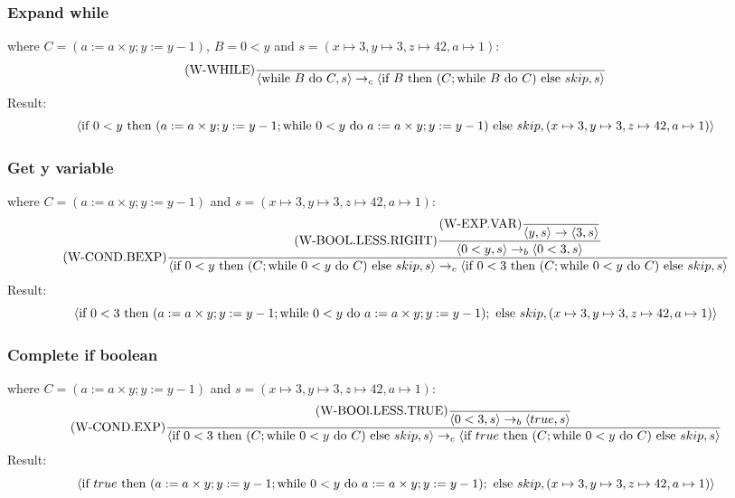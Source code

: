 \documentclass{report}
\begin{document}
            \subsubsection*{Expand while}
                where $C = (a:= a \times y; y:= y - 1)$, $B = 0<y$ and $s = (x \mapsto 3, y \mapsto 3, z \mapsto 42, a \mapsto 1)$:
                \[\text{(W-WHILE)}\dfrac{}{\langle \text{while } B \text{ do } C, s \rangle \to_c \langle \text{if } B \text{ then } (C; \text{while } B \text{ do } C) \text{ else } skip, s \rangle}\]
                Result:
                \[\langle \text{if } 0<y \text{ then } (a:= a \times y; y:= y - 1; \text{while } 0<y \text{ do } a:= a \times y; y:= y - 1) \text{ else } skip, (x \mapsto 3, y \mapsto 3, z \mapsto 42, a \mapsto 1) \rangle\]
            \subsubsection*{Get y variable}
                where $C = (a:= a \times y; y:= y - 1)$ and $s = (x \mapsto 3, y \mapsto 3, z \mapsto 42, a \mapsto 1)$:
                \[\text{(W-COND.BEXP)}\dfrac{
                    \text{(W-BOOL.LESS.RIGHT)}\dfrac{
                        \text{(W-EXP.VAR)}\dfrac{}{\langle y, s \rangle \to \langle 3, s \rangle}
                    }{\langle 0<y, s \rangle \to_b \langle 0<3, s \rangle}
                }{\langle \text{if } 0<y \text{ then } (C; \text{while } 0<y \text{ do } C) \text{ else } skip, s \rangle \to_c \langle \text{if } 0<3 \text{ then } (C; \text{while } 0<y \text{ do } C) \text{ else } skip, s \rangle}\]
                Result:
                \[\langle \text{if } 0<3 \text{ then } (a:= a \times y; y:= y - 1; \text{while } 0<y \text{ do } a:= a \times y; y:= y - 1); \text{ else } skip, (x \mapsto 3, y \mapsto 3, z \mapsto 42, a \mapsto 1) \rangle\]
            \subsubsection*{Complete if boolean}
                where $C = (a:= a \times y; y:= y - 1)$ and $s = (x \mapsto 3, y \mapsto 3, z \mapsto 42, a \mapsto 1)$:
                \[\text{(W-COND.EXP)}\dfrac{
                    \text{(W-BOOl.LESS.TRUE)}\dfrac{}{\langle 0<3, s \rangle \to_b \langle true, s \rangle}
                }{\langle \text{if } 0<3 \text{ then } (C; \text{while } 0<y \text{ do } C) \text{ else } skip, s \rangle \to_c \langle \text{if } true \text{ then } (C; \text{while } 0<y \text{ do } C) \text{ else } skip, s \rangle}\]
                Result:
                \[\langle \text{if } true \text{ then } (a:= a \times y; y:= y - 1; \text{while } 0<y \text{ do } a:= a \times y; y:= y - 1); \text{ else } skip, (x \mapsto 3, y \mapsto 3, z \mapsto 42, a \mapsto 1) \rangle\]
\end{document}
